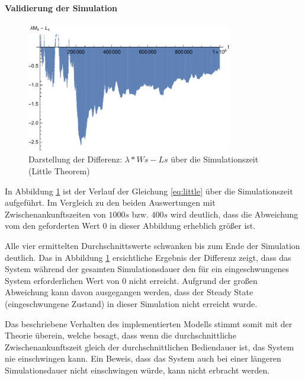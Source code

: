 \paragraph{Validierung der Simulation}
\begin{figure}[htpb]
	\centering
	\includegraphics[width=0.8\textwidth]{abbildungen/1_Phone/Arrival_100_Serve_100_dur_1000000_Skip_0/LittleSystem.pdf}
	\caption{Darstellung der Differenz: $\lambda * Ws - Ls$ über die Simulationszeit (Little Theorem)}
	\label{fig:LittleSystem100}
\end{figure}
In Abbildung \ref{fig:LittleSystem100} ist der Verlauf der Gleichung \ref{eq:little} über die Simulationszeit aufgeführt. Im Vergleich zu den beiden Auswertungen mit Zwischenankunftszeiten von $1000s$ bzw. $400s$ wird deutlich, dass die Abweichung vom den geforderten Wert $0$ in dieser Abbildung erheblich größer ist.

Alle vier ermittelten Durchschnittswerte schwanken bis zum Ende der Simulation deutlich. Das in Abbildung \ref{fig:LittleSystem100} ersichtliche Ergebnis der Differenz zeigt, dass das System während der gesamten Simulationsdauer den für ein eingeschwungenes System erforderlichen Wert von $0$ nicht erreicht. Aufgrund der großen Abweichung kann davon ausgegangen werden, dass der Steady State (eingeschwungene Zustand) in dieser Simulation nicht erreicht wurde.

Das beschriebene Verhalten des implementierten Modells stimmt somit mit der Theorie überein, welche besagt, dass wenn die durchschnittliche Zwischenankunftszeit gleich der durchschnittlichen Bediendauer ist, das System nie einschwingen kann. Ein Beweis, dass das System auch bei einer längeren Simulationsdauer nicht einschwingen würde, kann nicht erbracht werden.

